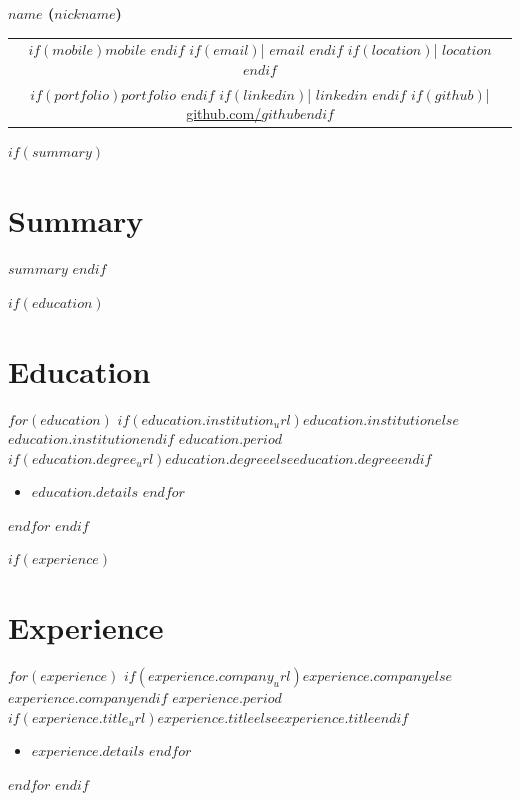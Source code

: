 \documentclass[10.5pt,a4paper]{article}
\newcommand{\daterange}[1]{\textbf{#1}}
\begin{document}
\begin{center}
	{\LARGE \textbf{$name$ ($nickname$)}}\\
	\begin{tabular}{@{}c@{}}
		$if(mobile)$$mobile$ $endif$
		$if(email)$| \href{mailto:$email$}{$email$} $endif$
		$if(location)$| $location$$endif$ \\
			$if(portfolio)$\href{https://$portfolio$}{$portfolio$} $endif$
		$if(linkedin)$| \href{https://$linkedin$}{$linkedin$} $endif$
		$if(github)$| \href{https://github.com/$github$}{github.com/$github$}$endif$
	\end{tabular}
\end{center}

$if(summary)$
\section*{Summary}
$summary$
$endif$

$if(education)$
\section*{Education}
$for(education)$
\noindent\textbf{$if(education.institution_url)$\href{$education.institution_url$}{$education.institution$}$else$$education.institution$$endif$} \hfill \daterange{$education.period$}\\
$if(education.degree_url)$\href{$education.degree_url$}{$education.degree$}$else$$education.degree$$endif$
\begin{itemize}
	$for(education.details)$
	\item $education.details$
	      $endfor$
\end{itemize}
\vspace{-0.1cm}
$endfor$
$endif$

$if(experience)$
\section*{Experience}
$for(experience)$
\noindent\textbf{$if(experience.company_url)$\href{$experience.company_url$}{$experience.company$}$else$$experience.company$$endif$} \hfill \daterange{$experience.period$}\\
\textit{$if(experience.title_url)$\href{$experience.title_url$}{$experience.title$}$else$$experience.title$$endif$}
\begin{itemize}
	$for(experience.details)$
	\item $experience.details$
	      $endfor$
\end{itemize}
\vspace{-0.1cm}
$endfor$
$endif$
\end{document}
